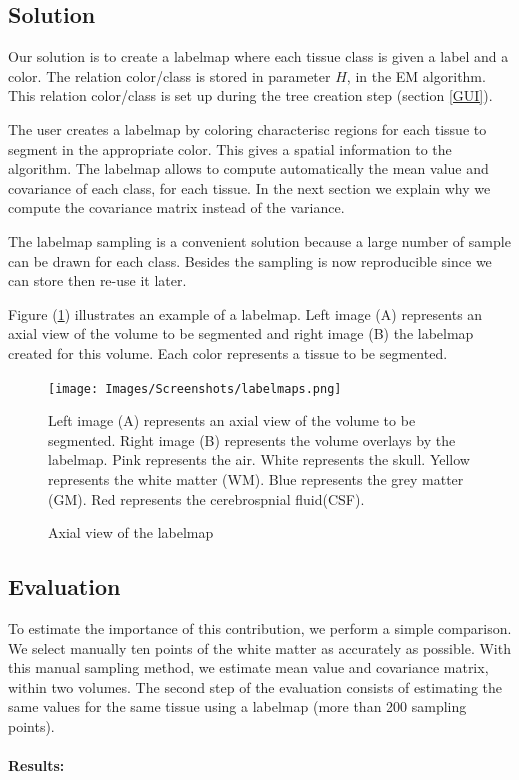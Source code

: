 \subsection{Solution}
%
Our solution is to create a labelmap where each tissue class is given a label and a color. The relation color/class is stored in parameter $H$, in the EM algorithm. This relation color/class is set up during the tree creation step (section  \ref{GUI}).
\par
The user creates a labelmap by coloring characterisc regions for each tissue to segment in the appropriate color. This gives a spatial information to the algorithm. The labelmap allows to compute automatically the mean value and covariance of each class, for each tissue. In the next section we explain why we compute the covariance matrix instead of the variance.
\par 
The labelmap sampling is a convenient solution because a large number of sample can be drawn for each class. Besides the sampling is now reproducible since we can store then re-use it later.

Figure (\ref{fig:labelmaps}) illustrates an example of a labelmap. Left image (A) represents an axial view of the volume to be segmented and right image (B) the labelmap created for this volume. Each color represents a tissue to be segmented.

\begin{figure}\centering
  \texttt{[image: Images/Screenshots/labelmaps.png]}
  \caption{Axial view of the labelmap}{Left image (A) represents an axial view of the volume to be segmented. Right image (B) represents the volume overlays by the labelmap. Pink represents the air. White represents the skull. Yellow represents the white matter (WM). Blue represents the grey matter (GM). Red represents the cerebrospnial fluid(CSF).}\label{fig:labelmaps}
\end{figure}
\subsection{Evaluation}
To estimate the importance of this contribution, we perform a simple comparison. We select manually ten points of the white matter as accurately as possible. With this manual sampling method, we estimate mean value and covariance matrix, within two volumes. The second step of the evaluation consists of estimating the same values for the same tissue using a labelmap (more than 200 sampling points). \\ \\
\textbf{Results:}

